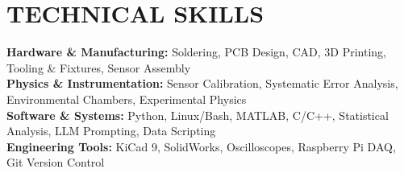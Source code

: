 \documentclass[letterpaper,11pt]{article}
\begin{document}
\section{TECHNICAL SKILLS}
 \begin{itemize}[leftmargin=0.15in, label={}]
    \small{\item{
     \textbf{Hardware \& Manufacturing:} Soldering, PCB Design, CAD, 3D Printing, Tooling \& Fixtures, Sensor Assembly \\
     \textbf{Physics \& Instrumentation:} Sensor Calibration, Systematic Error Analysis, Environmental Chambers, Experimental Physics \\
     \textbf{Software \& Systems:} Python, Linux/Bash, MATLAB, C/C++, Statistical Analysis, LLM Prompting, Data Scripting \\
     \textbf{Engineering Tools:} KiCad 9, SolidWorks, Oscilloscopes, Raspberry Pi DAQ, Git Version Control
    }}
 \end{itemize}


\end{document}
